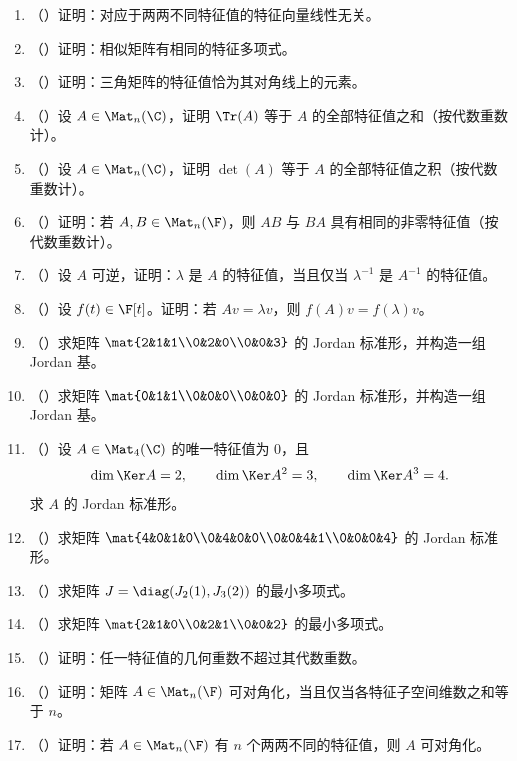 \begin{enumerate}[label=\arabic*., leftmargin=2.8em, resume]
  \item （\medium）证明：对应于两两不同特征值的特征向量线性无关。
  \item （\medium）证明：相似矩阵有相同的特征多项式。
  \item （\medium）证明：三角矩阵的特征值恰为其对角线上的元素。
  \item （\medium）设 \(A\in \Mat_n(\C)\)，证明 \(\Tr(A)\) 等于 \(A\) 的全部特征值之和（按代数重数计）。
  \item （\medium）设 \(A\in \Mat_n(\C)\)，证明 \(\det(A)\) 等于 \(A\) 的全部特征值之积（按代数重数计）。
  \item （\medium）证明：若 \(A,B\in \Mat_n(\F)\)，则 \(AB\) 与 \(BA\) 具有相同的非零特征值（按代数重数计）。
  \item （\medium）设 \(A\) 可逆，证明：\(\lambda\) 是 \(A\) 的特征值，当且仅当 \(\lambda^{-1}\) 是 \(A^{-1}\) 的特征值。
  \item （\medium）设 \(f(t)\in \F[t]\)。证明：若 \(Av=\lambda v\)，则 \(f(A)v=f(\lambda)v\)。
  \item （\medium）求矩阵 \(\mat{2&1&1\\0&2&0\\0&0&3}\) 的 Jordan 标准形，并构造一组 Jordan 基。
  \item （\medium）求矩阵 \(\mat{0&1&1\\0&0&0\\0&0&0}\) 的 Jordan 标准形，并构造一组 Jordan 基。
  \item （\medium）设 \(A\in \Mat_4(\C)\) 的唯一特征值为 \(0\)，且
  \[
  \dim\Ker A=2,\qquad \dim\Ker A^2=3,\qquad \dim\Ker A^3=4.
  \]
  求 \(A\) 的 Jordan 标准形。
  \item （\medium）求矩阵 \(\mat{4&0&1&0\\0&4&0&0\\0&0&4&1\\0&0&0&4}\) 的 Jordan 标准形。
  \item （\medium）求矩阵 \(J=\diag(J_2(1),J_3(2))\) 的最小多项式。
  \item （\medium）求矩阵 \(\mat{2&1&0\\0&2&1\\0&0&2}\) 的最小多项式。
  \item （\medium）证明：任一特征值的几何重数不超过其代数重数。
  \item （\medium）证明：矩阵 \(A\in \Mat_n(\F)\) 可对角化，当且仅当各特征子空间维数之和等于 \(n\)。
  \item （\medium）证明：若 \(A\in \Mat_n(\F)\) 有 \(n\) 个两两不同的特征值，则 \(A\) 可对角化。

\end{enumerate}
